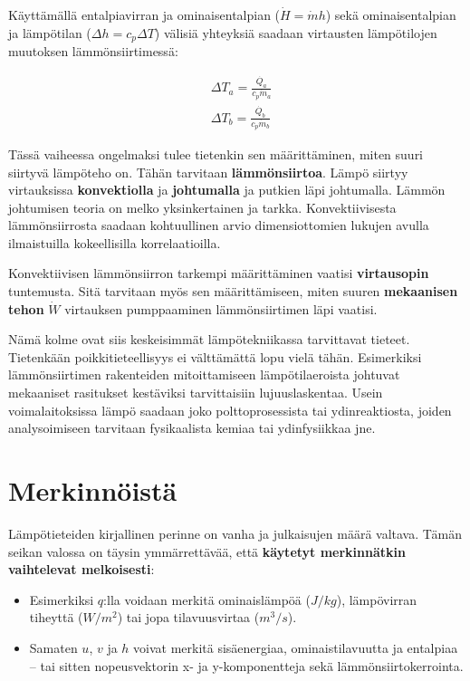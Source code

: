 \documentclass[12pt,a4paper,finnish]{book}
\begin{document}
Käyttämällä entalpiavirran ja ominaisentalpian ($\dot{H} = \dot{m}h$) sekä ominaisentalpian ja lämpötilan 
($\Delta h = c_p \Delta T$) välisiä yhteyksiä saadaan virtausten lämpötilojen muutoksen lämmönsiirtimessä:

\begin{align}
 &\Delta T_a = \frac{\dot{Q_a}}{c_p\dot{m}_a}\\
 &\Delta T_b = \frac{\dot{Q_b}}{c_p\dot{m}_b}
\end{align}

Tässä vaiheessa ongelmaksi tulee tietenkin sen määrittäminen, miten suuri siirtyvä lämpöteho on. Tähän 
tarvitaan \textbf{lämmönsiirtoa}. Lämpö siirtyy virtauksissa \textbf{konvektiolla} ja \textbf{johtumalla} 
ja putkien läpi johtumalla. Lämmön johtumisen teoria on melko yksinkertainen ja tarkka. Konvektiivisesta 
lämmönsiirrosta saadaan kohtuullinen arvio dimensiottomien lukujen avulla ilmaistuilla kokeellisilla 
korrelaatioilla.

Konvektiivisen lämmönsiirron tarkempi määrittäminen vaatisi \textbf{virtausopin} tuntemusta. Sitä 
tarvitaan myös sen määrittämiseen, miten suuren \textbf{mekaanisen tehon} $\dot{W}$ virtauksen 
pumppaaminen lämmönsiirtimen läpi vaatisi.

Nämä kolme ovat siis keskeisimmät lämpötekniikassa tarvittavat tieteet. Tietenkään poikkitieteellisyys 
ei välttämättä lopu vielä tähän. Esimerkiksi lämmönsiirtimen rakenteiden mitoittamiseen 
lämpötilaeroista johtuvat mekaaniset rasitukset kestäviksi tarvittaisiin lujuuslaskentaa. Usein 
voimalaitoksissa lämpö saadaan joko polttoprosessista tai ydinreaktiosta, joiden analysoimiseen 
tarvitaan fysikaalista kemiaa tai ydinfysiikkaa jne.

\section{Merkinnöistä} %

Lämpötieteiden kirjallinen perinne on vanha ja julkaisujen määrä valtava. Tämän seikan valossa on täysin 
ymmärrettävää, että \textbf{käytetyt merkinnätkin vaihtelevat melkoisesti}:

\begin{itemize}
 \item Esimerkiksi $q$:lla voidaan merkitä ominaislämpöä ($J/kg$), lämpövirran tiheyttä ($W/m^2$) tai jopa 
  tilavuusvirtaa ($m^3/s$). 
 \item Samaten $u$, $v$ ja $h$ voivat merkitä sisäenergiaa, ominaistilavuutta ja entalpiaa -- tai 
  sitten nopeusvektorin x- ja y-komponentteja sekä lämmönsiirtokerrointa.
\end{itemize}
  
\end{document}
